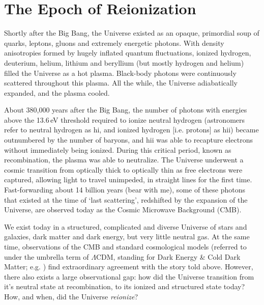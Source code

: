 \chapter{The Epoch of Reionization}
\label{chapter:eor_intro}

Shortly after the Big Bang, the Universe existed as an opaque, primordial soup of quarks, leptons, gluons and extremely energetic photons.
With density anisotropies formed by hugely inflated quantum fluctuations, ionized hydrogen, deuterium, helium, lithium and beryllium (but mostly hydrogen and helium) filled the Universe as a hot plasma. 
Black-body photons were continuously scattered throughout this plasma. All the while, the Universe adiabatically expanded, and the plasma cooled. 

About 380,000 years after the Big Bang, the number of photons with energies above the 13.6\,eV threshold required to ionize neutral hydrogen (astronomers refer to neutral hydrogen as {\sc hi}, and ionized hydrogen [i.e. protons] as {\sc hii}) became outnumbered by the number of baryons, and {\sc hii} was able to recapture electrons without immediately being ionized. 
During this critical period, known as recombination, the plasma was able to neutralize. The Universe underwent a cosmic transition from optically thick to optically thin as free electrons were captured, allowing light to travel unimpeded, in straight lines for the first time.
Fast-forwarding about 14 billion years (bear with me), some of these photons that existed at the time of `last scattering', redshifted by the expansion of the Universe, are observed today as the Cosmic Microwave Background (CMB).

We exist today in a structured, complicated and diverse Universe of stars and galaxies, dark matter and dark energy, but very little neutral gas. At the same time, observations of the CMB \citep[e.g.][]{Planck.16.1, Planck.16} and standard cosmological models (referred to under the umbrella term of $\Lambda$CDM, standing for Dark Energy \& Cold Dark Matter; e.g. \citet{Komatsu.09}) find extraordinary agreement with the story told above. However, there also exists a large observational gap: how did the Universe transition from it's neutral state at recombination, to its ionized and structured state today? How, and when, did the Universe \textit{reionize}?

